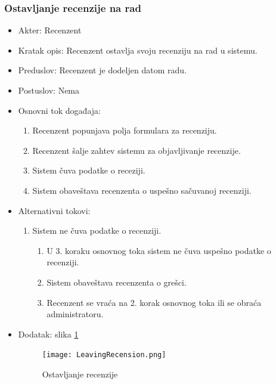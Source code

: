 \documentclass[a4paper]{article}
\begin{document}
\subsubsection{Ostavljanje recenzije na rad}
\label{subsubsection:ostavljanjerecenzijesec}
\begin{itemize}
    \item Akter: Recenzent
    \item Kratak opis: Recenzent ostavlja svoju recenziju na rad u sistemu.
    \item Preduslov: Recenzent je dodeljen datom radu.
    \item Postuslov: Nema
    \item Osnovni tok događaja:
        \begin{enumerate}
            \item Recenzent popunjava polja formulara za recenziju.
            \item Recenzent šalje zahtev sistemu za objavljivanje recenzije.
            \item Sistem čuva podatke o receziji.
            \item Sistem obaveštava recenzenta o uspešno sačuvanoj recenziji.
        \end{enumerate}
    \item Alternativni tokovi:
        \begin{enumerate}
            \item Sistem ne čuva podatke o recenziji.
            \begin{enumerate}
                \item U 3. koraku osnovnog toka sistem ne čuva uspešno podatke o recenziji.
                \item Sistem obaveštava recenzenta o grešci.
                \item Recenzent se vraća na 2. korak osnovnog toka ili se obraća administratoru.
            \end{enumerate}
        \end{enumerate}
        \item Dodatak: slika \ref{fig:ostavljanjerecenzije}
        \begin{figure}[hbt!]
    \centering
    \texttt{[image: LeavingRecension.png]}
    \caption{Ostavljanje recenzije}
    \label{fig:ostavljanjerecenzije}
\end{figure}
\end{itemize}

\newpage
\end{document}

